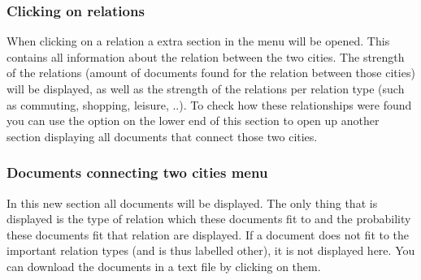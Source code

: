 \subsubsection{Clicking on relations}
When clicking on a relation a extra section in the menu will be opened. This contains all information about the relation between the two cities. The strength of the relations (amount of documents found for the relation between those cities) will be displayed, as well as the strength of the relations per relation type (such as commuting, shopping, leisure, ..). To check how these relationships were found you can use the option on the lower end of this section to open up another section displaying all documents that connect those two cities.

\subsubsection{Documents connecting two cities menu}
In this new section all documents will be displayed. The only thing that is displayed is the type of relation which these documents fit to and the probability these documents fit that relation are displayed. If a document does not fit to the important relation types (and is thus labelled other), it is not displayed here. You can download the documents in a text file by clicking on them.


